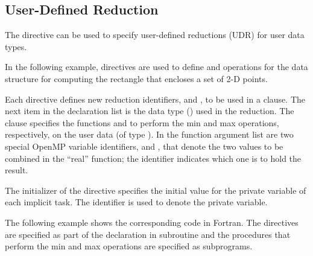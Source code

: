 \subsection{User-Defined Reduction}
\label{subsec:UDR}

The  directive can be used to specify 
user-defined reductions (UDR) for user data types.

In the following example,  directives are used to define
 and  operations for the  data structure for computing
the rectangle that encloses a set of 2-D points.

Each  directive defines new reduction identifiers,
 and , to be used in a  clause. The next item in the
declaration list is the data type () used in the
reduction.
The  clause specifies the functions  and
 to perform
the min and max operations, respectively, on the user data (of type ).
In the function argument list are two special OpenMP variable identifiers,  and ,
that denote the two values to be combined in the ``real'' function;
the  identifier indicates which one is to hold the result.

The initializer of the  directive specifies
the initial value for the private variable of each implicit task.
The  identifier is used to denote the private variable.


The following example shows the corresponding code in Fortran. 
The  directives are specified as part of 
the declaration in subroutine  and 
the procedures that perform the min and max operations are specified as subprograms.

